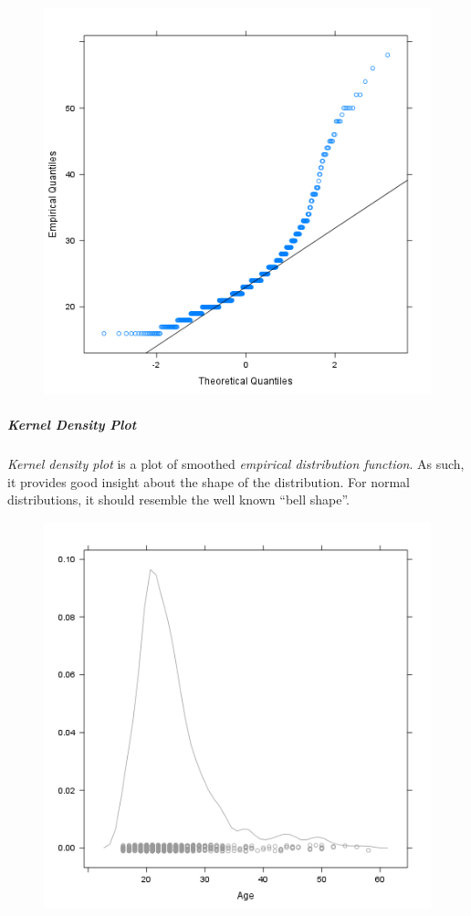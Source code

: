 \documentclass[]{article}
\makeatletter
\def\maxwidth{\ifdim\Gin@nat@width>\linewidth\linewidth
\else\Gin@nat@width\fi}
\let\Oldincludegraphics\includegraphics
\renewcommand{\includegraphics}[1]{\Oldincludegraphics[width=\maxwidth]{#1}}
\makeatother
\begin{document}
\begin{figure}[htbp]
\centering
\includegraphics{cbbba756d844aa053998959b73b9feff.png}
\caption{}
\end{figure}

\subparagraph{Kernel Density Plot}

\emph{Kernel density plot} is a plot of smoothed \emph{empirical
distribution function}. As such, it provides good insight about the
shape of the distribution. For normal distributions, it should resemble
the well known ``bell shape''.

\begin{figure}[htbp]
\centering
\includegraphics{a57b3f7264716e2a7e1261210f25375f.png}
\caption{}
\end{figure}
\end{document}
